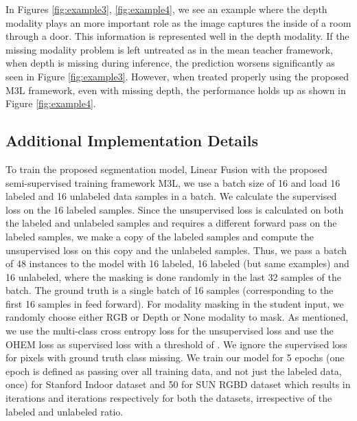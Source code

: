 \documentclass[10pt,twocolumn,letterpaper]{article}
\begin{document}
In Figures \ref{fig:example3}, \ref{fig:example4}, we see an example where the depth modality plays an more important role as the image captures the inside of a room through a door. This information is represented well in the depth modality. If the missing modality problem is left untreated as in the mean teacher \cite{mt} framework, when depth is missing during inference, the prediction worsens significantly as seen in Figure \ref{fig:example3}. However, when treated properly using the proposed M3L framework, even with missing depth, the performance holds up as shown in Figure \ref{fig:example4}. \subsection{Additional Implementation Details}
To train the proposed segmentation model, Linear Fusion with the proposed semi-supervised training framework M3L, we use a batch size of 16 and load 16 labeled and 16 unlabeled data samples in a batch. We calculate the supervised loss on the 16 labeled samples. Since the unsupervised loss is calculated on both the labeled and unlabeled samples and requires a different forward pass on the labeled samples, we make a copy of the labeled samples and compute the unsupervised loss on this copy and the unlabeled samples. Thus, we pass a batch of 48 instances to the model with 16 labeled, 16 labeled (but same examples) and 16 unlabeled, where the masking is done randomly in the last 32 samples of the batch. The ground truth is a single batch of 16 samples (corresponding to the first 16 samples in feed forward). 
For modality masking in the student input, we randomly choose either RGB or Depth or None modality to mask. As mentioned, we use the multi-class cross entropy loss for the unsupervised loss and use the OHEM loss \cite{ohem} as supervised loss with a threshold of . We ignore the supervised loss for pixels with ground truth class missing. We train our model for 5 epochs (one epoch is defined as passing over all training data, and not just the labeled data, once) for Stanford Indoor dataset and 50 for SUN RGBD dataset which results in  iterations and  iterations respectively for both the datasets, irrespective of the labeled and unlabeled ratio.  
\end{document}
